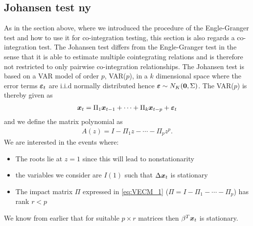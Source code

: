 \subsection{Johansen test ny}
As in the section above, where we introduced the procedure of the Engle-Granger test and how to use it for co-integration testing, this section is also regards a co-integration test. The Johansen test differs from the Engle-Granger test in the sense that it is able to estimate multiple cointegrating relations and is therefore not restricted to only pairwise co-integration relationships. The Johansen test is based on a VAR model of order $p$, VAR($p$), in a $k$ dimensional space where the error terms $\boldsymbol{\varepsilon}_t$ are i.i.d normally distributed hence $\boldsymbol{\varepsilon}\sim N_K(\boldsymbol{0},\Sigma)$. The VAR($p$) is thereby given as
\begin{align}\label{eq:var_p_johansen}
\boldsymbol{x}_t=\Pi_1\boldsymbol{x}_{t-1}+\cdots+\Pi_k\boldsymbol{x}_{t-p}+\boldsymbol{\varepsilon}_t
\end{align}
and we define the matrix polynomial as
\begin{align*}
    A(z)=I-\Pi_1z-\cdots-\Pi_pz^p.
\end{align*}
We are interested in the events where: 
\begin{itemize}
    \item The roots lie at $z=1$ since this will lead to nonstationarity
    \item the variables we consider are $I(1)$ such that $\Delta \boldsymbol{x}_t$ is stationary
    \item The impact matrix $\Pi$ expressed in \eqref{eq:VECM_1} ($\Pi=I-\Pi_1-\cdots-\Pi_p$) has rank $r<p$
\end{itemize}  
We know from earlier that for suitable $p\times r$ matrices then $\beta^T \boldsymbol{x}_t$ is stationary.\\\\







